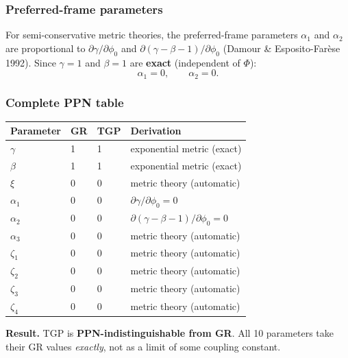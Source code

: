 \subsubsection{Preferred-frame parameters}

For semi-conservative metric theories, the preferred-frame parameters
$\alpha_{1}$ and $\alpha_{2}$ are proportional to
$\partial\gamma/\partial\phi_{0}$ and
$\partial(\gamma-\beta-1)/\partial\phi_{0}$ (Damour \&
Esposito-Far\`ese 1992).  Since $\gamma=1$ and $\beta=1$ are
\textbf{exact} (independent of $\Phi$):
\begin{equation}\label{eq:alpha12-ppn}
  \boxed{\alpha_{1} = 0, \qquad \alpha_{2} = 0.}
\end{equation}

\subsubsection{Complete PPN table}

\begin{center}\small
\begin{tabular}{@{}llll@{}}
\toprule
\textbf{Parameter} & \textbf{GR} & \textbf{TGP} & \textbf{Derivation} \\
\midrule
$\gamma$   & 1 & 1 & exponential metric (exact) \\
$\beta$    & 1 & 1 & exponential metric (exact) \\
$\xi$      & 0 & 0 & metric theory (automatic) \\
$\alpha_{1}$ & 0 & 0 & $\partial\gamma/\partial\phi_{0}=0$ \\
$\alpha_{2}$ & 0 & 0 & $\partial(\gamma{-}\beta{-}1)/\partial\phi_{0}=0$ \\
$\alpha_{3}$ & 0 & 0 & metric theory (automatic) \\
$\zeta_{1}$  & 0 & 0 & metric theory (automatic) \\
$\zeta_{2}$  & 0 & 0 & metric theory (automatic) \\
$\zeta_{3}$  & 0 & 0 & metric theory (automatic) \\
$\zeta_{4}$  & 0 & 0 & metric theory (automatic) \\
\bottomrule
\end{tabular}
\end{center}

\noindent\textbf{Result.}
TGP is \textbf{PPN-indistinguishable from GR}.
All 10 parameters take their GR values \emph{exactly}, not as a
limit of some coupling constant.

